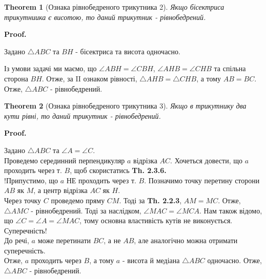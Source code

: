 \documentclass[a4paper, 10pt]{article}
\makeatletter
\def\qed{$\blacksquare$}
\theoremstyle{theoremdd}
\newtheorem{theorem}{Theorem}[subsection]
\theoremstyle{theoremdd}
\theoremstyle{theoremdd}
\theoremstyle{theoremdd}
\theoremstyle{theoremdd}
\theoremstyle{theoremdd}
\theoremstyle{theoremdd}
\theoremstyle{theoremdd}
\theoremstyle{theoremdd}
\renewenvironment{proof}[1][Proof.\\]{\par
\pushQED{\hfill \qed}%
\normalfont \topsep6\p@\@plus6\p@\relax
\trivlist
\item\relax
{\bfseries
#1\@addpunct{.}}\hspace\labelsep\ignorespaces
}{%
\popQED\endtrivlist\@endpefalse
}
\makeatother
\begin{document}
\begin{theorem}[Ознака рівнобедреного трикутника 2]
Якщо бісектриса трикутниика є висотою, то даний трикутник - рівнобедрений.
\end{theorem}

\begin{proof}
Задано $\triangle ABC$ та $BH$ - бісектриса та висота одночасно.
\begin{figure}[H]
\centering
{}
\end{figure}
Із умови задачі ми маємо, що $\angle ABH = \angle CBH$, $\angle AHB = \angle CHB$ та спільна сторона $BH$. Отже, за II ознаком рівності, $\triangle AHB = \triangle CHB$, а тому $AB = BC$. Отже, $\triangle ABC$ - рівнобедрений.
\end{proof}

\begin{theorem}[Ознака рівнобедреного трикутника 3]
Якщо в трикутнику два кути рівні, то даний трикутник - рівнобедрений.
\end{theorem}

\begin{proof}
Задано $\triangle ABC$ та $\angle A = \angle C$.\\
Проведемо серединний перпендикуляр $a$ відрізка $AC$. Хочеться довести, що $a$ проходить через т. $B$, щоб скористатись \textbf{Th. 2.3.6.}\\
!Припустимо, що $a$ НЕ проходить через т. $B$. Позначимо точку перетину сторони $AB$ як $M$, а центр відрізка $AC$ як $H$.\\
Через точку $C$ проведемо пряму $CM$. Тоді за \textbf{Th. 2.2.3}, $AM = MC$. Отже, $\triangle AMC$ - рівнобедрений. Тоді за наслідком, $\angle MAC = \angle MCA$. Нам також відомо, що $\angle C = \angle A = \angle MAC$, тому основна властивість кутів не виконується. Суперечність!\\
До речі, $a$ може перетинати $BC$, а не $AB$, але аналогічно можна отримати суперечність.\\
Отже, $a$ проходить через $B$, а тому $a$ - висота й медіана $\triangle ABC$ одночасно. Отже, $\triangle ABC$ - рівнобедрений.
\end{proof}
\end{document}
